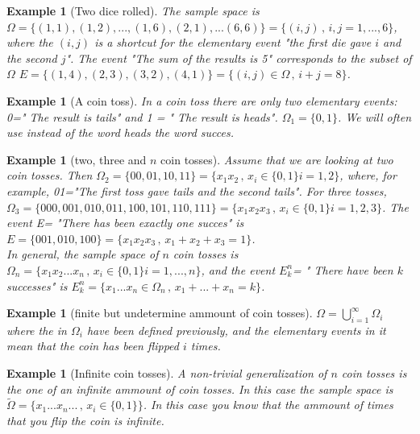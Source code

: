\documentclass[reqno]{amsart}
\newtheorem{example}[theorem]{Example}
\newcommand{\<}{{\langle \!\! \langle}}
\renewcommand{\>}{{\rangle \!\! \rangle}}
\begin{document}
\begin{example}[Two dice rolled]
The sample space is $\Omega=\{(1,1),(1,2),...,(1,6),(2,1),...(6,6) \}=\{(i,j)\,,\, i,j=1,...,6\}$, where the $(i,j)$ is a shortcut for the elementary event "the first die gave $i$ and the second $j$". The event "The sum of the results is 5" corresponds to the subset of $\Omega$ $E=\{(1,4),(2,3),(3,2),(4,1)\}=\{(i,j)\in \Omega \,,\,i+j=8\}$.   
\end{example}

\begin{example}[A coin toss]
In a coin toss there are only two elementary events: 0=" The result is tails" and 1 = " The result is heads". $\Omega_1=\{0,1\}$. We will often use instead of the word heads the word succes.   
\end{example}

\begin{example}[two, three and $n$ coin tosses]
Assume that we are looking at two coin tosses. Then $\Omega_2=\{00,01,10,11\}= \{x_1x_2\,,\, x_i\in\{0,1\} i=1,2\}$, where, for example,  01="The first toss gave tails and the second tails". For three tosses, $\Omega_3=\{000,001,010,011,100,101,110,111\}=\{x_1x_2x_3\,,\,x_i\in\{0,1\} i=1,2,3\}$. The event E= "There has been exactly one succes" is $E=\{001,010,100\}=\{x_1x_2x_3\,,\,x_1+x_2+x_3=1\}$. \\
In general, the sample space of $n$ coin tosses is $\Omega_n=\{x_1x_2...x_n\,,\,x_i\in\{0,1\} i=1,...,n\}$, and the event $E^n_k$= " There have been $k$ successes" is $ E^n_k=\{x_1...x_n\in \Omega_n\,,\,x_1+...+x_n=k\}$.     
\end{example}

\begin{example}[finite but undetermine ammount of coin tosses]
$\Omega=\bigcup_{i=1}^\infty \Omega_i$ where the  in $\Omega_i$ have been defined previously, and the elementary events in it mean that the coin has been flipped $i$ times. 

\end{example}

\begin{example}[Infinite coin tosses]
A non-trivial generalization of $n$ coin tosses is the one of an infinite ammount of coin tosses. In this case the sample space is 
$\tilde{\Omega}=\{x_1...x_n...\, ,\, x_i\in\{0,1\}\}$. In this case you know that the ammount of times that you flip the coin is infinite. 
 
\end{example}
\end{document}

